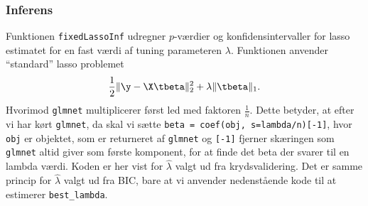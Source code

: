 \subsubsection{Inferens} \label{subsubsec:inferens}
Funktionen \texttt{fixedLassoInf} udregner \(p\)-værdier og konfidensintervaller for lasso estimatet for en fast værdi af tuning parameteren \(\lambda\).
Funktionen anvender ``standard'' lasso problemet
\begin{align*}
\frac{1}{2} \Vert \y - \X \tbeta \Vert_2^2 + \lambda \Vert \tbeta \Vert_1.
\end{align*}
Hvorimod \texttt{glmnet} multiplicerer først led med faktoren \(\frac{1}{n}\).
Dette betyder, at efter vi har kørt \texttt{glmnet}, da skal vi sætte \texttt{beta = coef(obj, s=lambda/n)[-1]}, hvor \texttt{obj} er objektet, som er returneret af \texttt{glmnet} og \texttt{[-1]} fjerner skæringen som \texttt{glmnet} altid giver som første komponent, for at finde det beta der svarer til en lambda værdi.
%
%
Koden er her vist for $\widehat{\lambda}$ valgt ud fra krydsvalidering. Det er samme princip for $\widehat{\lambda}$  valgt ud fra BIC,  bare at vi anvender nedenstående kode til at estimerer \texttt{best\_lambda}.



